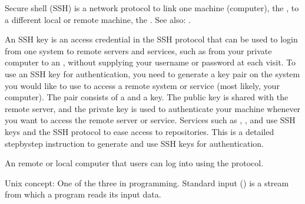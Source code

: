 \begin{description}
\ignorespaces 
\sphinxAtStartPar
Secure shell (SSH) is a network protocol to link one machine (computer),
the , to a different local or remote machine, the . See also: {\hyperref[\detokenize{glossary:term-SSH-server}]{}}.

\ignorespaces 
\sphinxAtStartPar
An SSH key is an access credential in the SSH protocol that can be used to login
from one system to remote servers and services, such as from your private
computer to an {\hyperref[\detokenize{glossary:term-SSH-server}]{}}, without supplying your username or password
at each visit. To use an SSH key for authentication, you need to generate a
key pair on the system you would like to use to access a remote system or service
(most likely, your computer).
The pair consists of a  and a  key. The public key is shared
with the remote server, and the private key is used to authenticate your machine
whenever you want to access the remote server or service.
Services such as {\hyperref[\detokenize{glossary:term-GitHub}]{}}, {\hyperref[\detokenize{glossary:term-GitLab}]{}}, and {\hyperref[\detokenize{glossary:term-GIN}]{}} use SSH keys and the SSH protocol
to ease access to repositories. This
is a detailed step\sphinxhyphen{}by\sphinxhyphen{}step instruction to generate and use SSH keys for authentication.

\ignorespaces 
\sphinxAtStartPar
An remote or local computer that users can log into using the {\hyperref[\detokenize{glossary:term-SSH}]{}} protocol.

\ignorespaces 
\sphinxAtStartPar
Unix concept: One of the three 
in programming. Standard input () is a stream from which a program
reads its input data.


\end{description}
